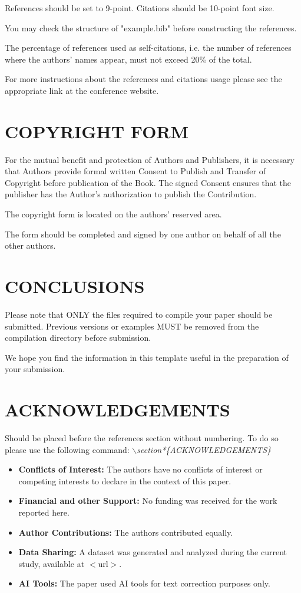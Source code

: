 \documentclass[a4paper,twoside]{article}
\begin{document}
References should be set to 9-point. Citations should be 10-point font size.

You may check the structure of "example.bib" before constructing the references.

The percentage of references used as self-citations, i.e. the number of references where the authors' names appear, must not exceed 20\% of the total.

For more instructions about the references and citations usage please see the appropriate link at the conference website.

\section{\uppercase{Copyright Form}}

For the mutual benefit and protection of Authors and Publishers, it is necessary that Authors provide formal written Consent to Publish and Transfer of Copyright before publication of the Book. The signed Consent ensures that the publisher has the Author's authorization to publish the Contribution.

The copyright form is located on the authors' reserved area.

The form should be completed and signed by one author on behalf of all the other authors.

\section{\uppercase{Conclusions}}
\label{sec:conclusion}

Please note that ONLY the files required to compile your paper should be submitted. Previous versions or examples MUST be removed from the compilation directory before submission.

We hope you find the information in this template useful in the preparation of your submission.


\section*{\uppercase{Acknowledgements}}

Should be placed before the references section without numbering. To do so please use the following command:
\textit{$\backslash$section*\{ACKNOWLEDGEMENTS\}}
\begin{itemize}
  \item \textbf{Conflicts of Interest:} The authors have no conflicts of interest or competing interests to declare in the context of this paper.
  \item \textbf{Financial and other Support:} No funding was received for the work reported here.
  \item \textbf{Author Contributions:} The authors contributed equally.
  \item \textbf{Data Sharing:} A dataset was generated and analyzed during the current study, available at $<$url$>$.
  \item \textbf{AI Tools:} The paper used AI tools for text correction purposes only.
\end{itemize}
\end{document}
